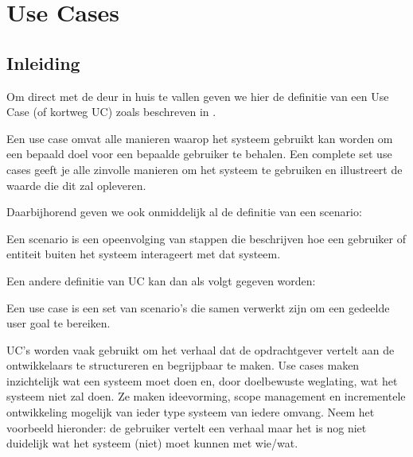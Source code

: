 \chapter{Use Cases}

\section{Inleiding}

Om direct met de deur in huis te vallen geven we hier de definitie van een Use Case (of kortweg UC) zoals beschreven in \cite{Jacobson2012}.
\begin{definition}
	Een use case omvat alle manieren waarop het systeem gebruikt kan worden om een bepaald doel voor een bepaalde gebruiker te behalen. Een complete set use cases geeft je alle zinvolle manieren om het systeem te gebruiken en illustreert de waarde die dit zal opleveren.
\end{definition}

Daarbijhorend geven we ook onmiddelijk al de definitie van een scenario:

\begin{definition}
	Een scenario is een opeenvolging van stappen die beschrijven hoe een gebruiker of entiteit buiten het systeem interageert met dat systeem. 
\end{definition}

Een andere definitie van UC kan dan als volgt gegeven worden:

\begin{definition}
	Een use case is een set van scenario's die samen verwerkt zijn om een gedeelde user goal te bereiken.
\end{definition}

UC's worden vaak gebruikt om het verhaal dat de opdrachtgever vertelt aan de ontwikkelaars te structureren en begrijpbaar te maken. Use cases maken inzichtelijk wat een systeem moet doen en, door doelbewuste weglating, wat het
systeem niet zal doen. Ze maken ideevorming, scope management en incrementele ontwikkeling mogelijk van ieder type systeem van iedere omvang. Neem het voorbeeld hieronder: de gebruiker vertelt een verhaal maar het is nog niet duidelijk wat het systeem (niet) moet kunnen met wie/wat.

